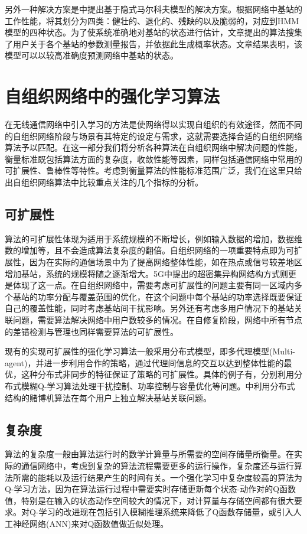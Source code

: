 \documentclass{IEEEtran}
\begin{document}
另外一种解决方案是\cite{Alias2016}中提出基于隐式马尔科夫模型的解决方案。根据网络中基站的工作性能，将其划分为四类：健壮的、退化的、残缺的以及脆弱的，对应到HMM模型的四种状态。为了使系统准确地对基站的状态进行估计，文章提出的算法搜集了用户关于各个基站的参数测量报告，并依据此生成概率状态。文章结果表明，该模型可以以较高准确度预测网络中基站的状态。

\section{自组织网络中的强化学习算法}
\label{sec:Compare}
在无线通信网络中引入学习的方法是使网络得以实现自组织的有效途径，然而不同的自组织网络阶段与场景有其特定的设定与需求，这就需要选择合适的自组织网络算法予以匹配。在这一部分我们将分析各种算法在自组织网络中解决问题的性能，衡量标准既包括算法方面的复杂度，收敛性能等因素，同样包括通信网络中常用的可扩展性、鲁棒性等特性。考虑到衡量算法的性能标准范围广泛，我们在这里只给出自组织网络算法中比较重点关注的几个指标的分析。
\subsection{可扩展性}
算法的可扩展性体现为适用于系统规模的不断增长，例如输入数据的增加，数据维数的增加等，且不会造成算法复杂度的翻倍。自组织网络的一项重要特点即为可扩展性，因为在实际的通信场景中为了提高网络整体性能，如在热点或信号较差地区增加基站，系统的规模将随之逐渐增大。5G中提出的超密集异构网结构方式则更是体现了这一点。在自组织网络中，需要考虑可扩展性的问题主要有同一区域内多个基站的功率分配与覆盖范围的优化，在这个问题中每个基站的功率选择既要保证自己的覆盖性能，同时考虑基站间干扰影响。另外还有考虑多用户情况下的基站关联问题，需要算法解决网络中用户数较多的情况。在自修复阶段，网络中所有节点的差错检测与管理也同样需要算法的可扩展性。

现有的实现可扩展性的强化学习算法一般采用分布式模型，即多代理模型(Multi-agent)，并进一步利用合作的策略，通过代理间信息的交互以达到整体性能的最优，这种分布式非同步的特征保证了策略的可扩展性。具体的例子有\cite{Dirani2010}\cite{Fan2014}\cite{Islam2012}，分别利用分布式模糊Q-学习算法处理干扰控制、功率控制与容量优化等问题。\cite{Maghsudi2017}中利用分布式结构的赌博机算法在每个用户上独立解决基站关联问题。

\subsection{复杂度}
算法的复杂度一般由算法运行时的数学计算量与所需要的空间存储量所衡量。在实际的通信网络中，考虑到复杂的算法流程需要更多的运行操作，复杂度还与运行算法所需的能耗以及运行结果产生的时间有关。一个强化学习中复杂度较高的算法为Q-学习方法，因为在算法运行过程中需要实时存储更新每个状态-动作对的Q函数值，特别是在输入的状态动作空间较大的情况下，对计算量与存储空间都有很大要求。对Q-学习的改进现在包括引入模糊推理系统来降低了Q函数存储量，或引入人工神经网络(ANN)来对Q函数值做近似处理\cite{Ghadimi2017}。
\end{document}
